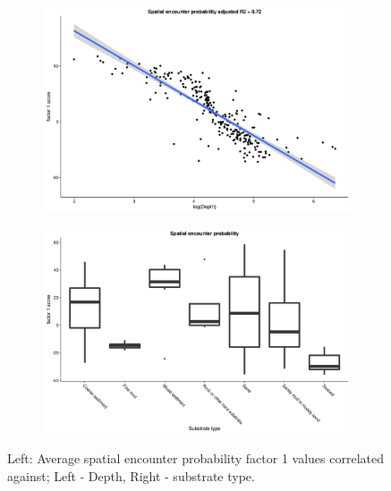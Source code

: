 \documentclass{article}
\newcommand{\beginsupplement}{%
		        \setcounter{table}{0}
		        \renewcommand{\thetable}{S\arabic{table}}%
		        \setcounter{figure}{0}
		        \renewcommand{\thefigure}{S\arabic{figure}}%
			     }
\begin{document}
\beginsupplement




\begin{figure}[!ht]
	\label{fig:S1}
	\begin{subfigure}{0.5\textwidth}
	\includegraphics[width = \linewidth]{"figures/Factor1_DepthO1"}
\end{subfigure}
\begin{subfigure}{0.5\textwidth}
	\includegraphics[width = \linewidth]{"figures/Factor1_HabitatO1"}
\end{subfigure}
\caption{Left: Average spatial encounter probability factor 1 values correlated
	against; Left - Depth, Right - substrate type.}

\end{figure}

\end{document}

